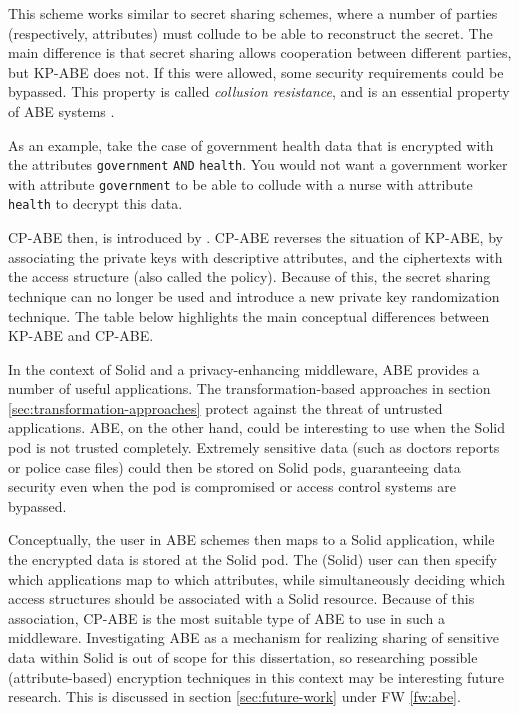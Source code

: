 

\noindent This scheme works similar to secret sharing schemes, where a number of parties (respectively, attributes) must collude to be able to reconstruct the secret. The main difference is that secret sharing allows cooperation between different parties, but \gls{KP-ABE} does not. If this were allowed, some security requirements could be bypassed. This property is called \textit{collusion resistance}, and is an essential property of \gls{ABE} systems \citep{cp-abe}. 

As an example, take the case of government health data that is encrypted with the attributes \texttt{government} \texttt{AND} \texttt{health}. You would not want a government worker with attribute \texttt{government} to be able to collude with a nurse with attribute \texttt{health} to decrypt this data.

\noindent \acrfull{CP-ABE} then, is introduced by \citet{cp-abe}. \Gls{CP-ABE} reverses the situation of \gls{KP-ABE}, by associating the private keys with descriptive attributes, and the ciphertexts with the access structure (also called the policy). Because of this, the secret sharing technique can no longer be used and \citeauthor{cp-abe} introduce a new private key randomization technique. The table below highlights the main conceptual differences between \gls{KP-ABE} and \gls{CP-ABE}.


\noindent In the context of Solid and a privacy-enhancing middleware, \gls{ABE} provides a number of useful applications. The transformation-based approaches in section \ref{sec:transformation-approaches} protect against the threat of untrusted applications. \Gls{ABE}, on the other hand, could be interesting to use when the Solid pod is not trusted completely. Extremely sensitive data (such as doctors reports or police case files) could then be stored on Solid pods, guaranteeing data security even when the pod is compromised or access control systems are bypassed.

Conceptually, the user in \gls{ABE} schemes then maps to a Solid application, while the encrypted data is stored at the Solid pod. The (Solid) user can then specify which applications map to which attributes, while simultaneously deciding which access structures should be associated with a Solid resource. Because of this association, \gls{CP-ABE} is the most suitable type of \gls{ABE} to use in such a middleware. Investigating \gls{ABE} as a mechanism for realizing sharing of sensitive data within Solid is out of scope for this dissertation, so researching possible (attribute-based) encryption techniques in this context may be interesting future research. This is discussed in section \ref{sec:future-work} under FW \ref{fw:abe}.
